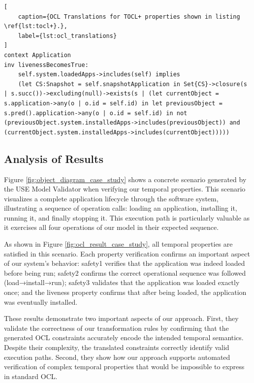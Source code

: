 \begin{lstlisting}[
    caption={OCL Translations for TOCL+ properties shown in listing \ref{lst:tocl+}.},
    label={lst:ocl_translations}
]
context Application
inv livenessBecomesTrue:
    self.system.loadedApps->includes(self) implies
    (let CS:Snapshot = self.snapshotApplication in Set{CS}->closure(s | s.succ())->excluding(null)->exists(s | (let currentObject = s.application->any(o | o.id = self.id) in let previousObject = s.pred().application->any(o | o.id = self.id) in not (previousObject.system.installedApps->includes(previousObject)) and (currentObject.system.installedApps->includes(currentObject)))))
\end{lstlisting}


\subsection{Analysis of Results}

\hspace{1cm} Figure \ref{fig:object_diagram_case_study} shows a concrete scenario 
generated by the USE Model Validator when verifying our temporal properties. This 
scenario visualizes a complete application lifecycle through the software system, 
illustrating a sequence of operation calls: loading an application, installing it, 
running it, and finally stopping it. This execution path is particularly valuable 
as it exercises all four operations of our model in their expected sequence.

As shown in Figure \ref{fig:ocl_result_case_study}, all temporal properties are 
satisfied in this scenario. Each property verification confirms an important aspect 
of our system's behavior: safety1 verifies that the application was indeed loaded 
before being run; safety2 confirms the correct operational sequence was followed 
(load→install→run); safety3 validates that the application was loaded exactly once; 
and the liveness property confirms that after being loaded, the application was 
eventually installed.

These results demonstrate two important aspects of our approach. First, they validate 
the correctness of our transformation rules by confirming that the generated OCL 
constraints accurately encode the intended temporal semantics. Despite their 
complexity, the translated constraints correctly identify valid execution paths. 
Second, they show how our approach supports automated verification of complex 
temporal properties that would be impossible to express in standard OCL.


